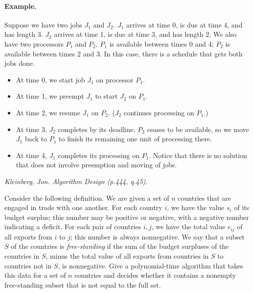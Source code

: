 \documentclass[solutionorbox,answers]{exam}
\begin{document}
\begin{questions}
{\paragraph{Example.} Suppose we have two jobs $J_1$ and $J_2$. $J_1$ arrives at time 0, is due
at time 4, and has length 3. $J_2$ arrives at time 1, is due at time 3, and has
length 2. We also have two processors $P_1$ and $P_2$. $P_1$ is available between
times 0 and 4; $P_2$ is available between times 2 and 3. In this case, there is
a schedule that gets both jobs done.
\begin{itemize}
\item At time 0, we start job $J_1$ on processor $P_1$.
\item At time 1, we preempt $J_1$ to start $J_2$ on $P_1$.
\item At time 2, we resume $J_1$ on $P_2$. ($J_2$ continues processing on $P_1$.)
\item At time 3, $J_2$ completes by its deadline. $P_2$ ceases to be available, so
we move $J_1$ back to $P_1$ to finish its remaining one unit of processing
there.
\item At time 4, $J_1$ completes its processing on $P_1$.
Notice that there is no solution that does not involve preemption and
moving of jobs.
\end{itemize}
}
\begin{solutionbox}{}

\end{solutionbox}

\newpage

\question \textit{Kleinberg, Jon. Algorithm Design (p.444, q.45).} 

Consider the following definition. We are given a set of $n$ countries that are engaged in trade with one another. For each country $i$, we have the value $s_i$ of its budget surplus; this number may be positive or negative,
with a negative number indicating a deficit. For each pair of countries $i, j$,
we have the total value $e_{ij}$ of all exports from $i$ to $j$; this number is always
nonnegative. We say that a subset $S$ of the countries is \emph{free-standing} if the
sum of the budget surpluses of the countries in $S$, minus the total value
of all exports from countries in $S$ to countries not in $S$, is nonnegative.
Give a polynomial-time algorithm that takes this data for a set of
$n$ countries and decides whether it contains a nonempty free-standing
subset that is not equal to the full set.

\begin{solutionbox}{}


\end{solutionbox}
\end{questions}
\end{document}

